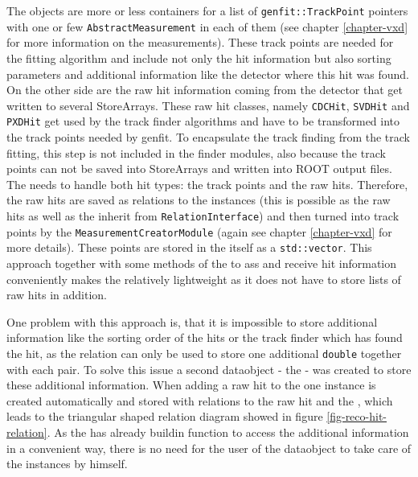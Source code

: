 The \Track objects are more or less containers for a list of \texttt{genfit::TrackPoint} pointers with one or few \texttt{AbstractMeasurement} in each of them (see chapter \ref{chapter-vxd} for more information on the measurements). These track points are needed for the fitting algorithm and include not only the hit information but also sorting parameters and additional information like the detector where this hit was found. On the other side are the raw hit information coming from the detector that get written to several StoreArrays. These raw hit classes, namely \texttt{CDCHit}, \texttt{SVDHit} and \texttt{PXDHit} get used by the track finder algorithms and have to be transformed into the track points needed by genfit. To encapsulate the track finding from the track fitting, this step is not included in the finder modules, also because the track points can not be saved into StoreArrays and written into ROOT output files. The \RecoTrack needs to handle both hit types: the track points and the raw hits. Therefore, the raw hits are saved as relations to the \RecoTrack instances (this is possible as the raw hits as well as the \RecoTrack inherit from \texttt{RelationInterface}) and then turned into track points by the \texttt{MeasurementCreatorModule} (again see chapter \ref{chapter-vxd} for more details). These points are stored in the \RecoTrack itself as a \texttt{std::vector}. This approach together with some methods of the \RecoTrack to ass and receive hit information conveniently makes the \RecoTrack relatively lightweight as it does not have to store lists of raw hits in addition.

One problem with this approach is, that it is impossible to store additional information like the sorting order of the hits or the track finder which has found the hit, as the relation can only be used to store one additional \texttt{double} together with each pair. To solve this issue a second dataobject - the \Hit - was created to store these additional information. When adding a raw hit to the \RecoTrack one \Hit instance is created automatically and stored with relations to the raw hit and the \RecoTrack, which leads to the triangular shaped relation diagram showed in figure \ref{fig-reco-hit-relation}. As the \RecoTrack has already buildin function to access the additional information in a convenient way, there is no need for the user of the dataobject to take care of the \Hit instances by himself. 

